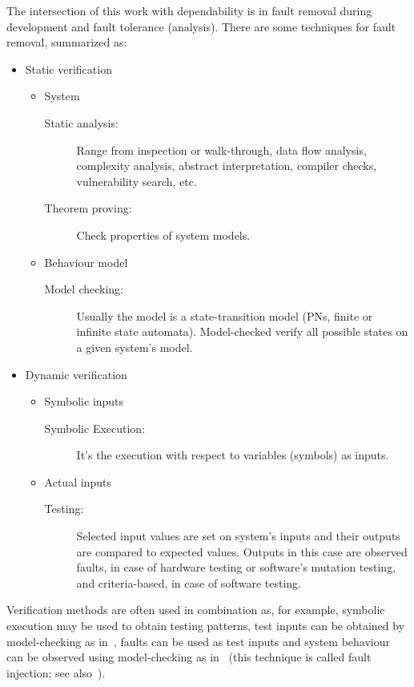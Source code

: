 \documentclass[en,twoside,onehalfspacing,phd]{risethesis}
\begin{document}
The intersection of this work with dependability is in fault removal during development and fault tolerance (analysis).
There are some techniques for fault removal, summarized as:
\begin{itemize}
  \item Static verification
  \begin{itemize}
    \item System
    \begin{description}
      \item[Static analysis:] Range from inspection or walk-through, data flow analysis, complexity analysis, abstract interpretation, compiler checks, vulnerability search, etc.
      \item[Theorem proving:] Check properties of system models.
    \end{description}
    \item Behaviour model
    \begin{description}
      \item[Model checking:] Usually the model is a state-transition model (\acp{PN}, finite or infinite state automata).
      Model-checked verify all possible states on a given system's model.
    \end{description}
  \end{itemize}
  \item Dynamic verification
  \begin{itemize}
    \item Symbolic inputs
    \begin{description}
      \item[Symbolic Execution:] It's the execution with respect to variables (symbols) as inputs.
    \end{description}
    \item Actual inputs
    \begin{description}
      \item[Testing:] Selected input values are set on system's inputs and their outputs are compared to expected values.
      Outputs in this case are observed faults, in case of hardware testing or software's mutation testing, and criteria-based, in case of software testing.
    \end{description}
  \end{itemize}
\end{itemize}

Verification methods are often used in combination as, for example, symbolic execution may be used to obtain testing patterns, test inputs can be obtained by model-checking as in~\cite{CBL+2014}, faults can be used as test inputs and system behaviour can be observed using model-checking as in~\cite{DM2012,Didier2012} (this technique is called fault injection; see also~\cite{AAL+1996}).
\end{document}
